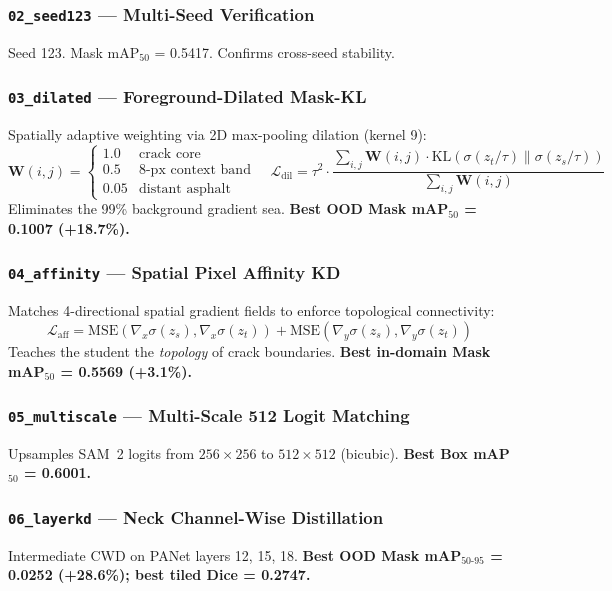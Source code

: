 \documentclass[12pt,a4paper]{article}
\begin{document}
\subsubsection{\texttt{02\_seed123} --- Multi-Seed Verification}
Seed 123. Mask mAP$_{50}$ = 0.5417. Confirms cross-seed stability.

\subsubsection{\texttt{03\_dilated} --- Foreground-Dilated Mask-KL}
\label{sec:dilated}
Spatially adaptive weighting via 2D max-pooling dilation (kernel 9):
\[
\mathbf{W}(i,j)=
\begin{cases}1.0 & \text{crack core}\\0.5 & \text{8-px context band}\\0.05 & \text{distant asphalt}\end{cases}
\quad
\mathcal{L}_\text{dil}=\tau^2\cdot\frac{\sum_{i,j}\mathbf{W}(i,j)\cdot\mathrm{KL}(\sigma(z_t/\tau)\|\sigma(z_s/\tau))}{\sum_{i,j}\mathbf{W}(i,j)}
\]
Eliminates the 99\% background gradient sea.
\textbf{Best OOD Mask mAP$_{50}$ = 0.1007 (+18.7\%).}

\subsubsection{\texttt{04\_affinity} --- Spatial Pixel Affinity KD}
\label{sec:affinity}
Matches 4-directional spatial gradient fields to enforce topological
connectivity:
\[
\mathcal{L}_\text{aff}=
  \mathrm{MSE}(\nabla_x\sigma(z_s),\nabla_x\sigma(z_t))+
  \mathrm{MSE}(\nabla_y\sigma(z_s),\nabla_y\sigma(z_t))
\]
Teaches the student the \emph{topology} of crack boundaries.
\textbf{Best in-domain Mask mAP$_{50}$ = 0.5569 (+3.1\%).}

\subsubsection{\texttt{05\_multiscale} --- Multi-Scale 512 Logit Matching}
Upsamples SAM~2 logits from $256\times256$ to $512\times512$ (bicubic).
\textbf{Best Box mAP$_{50}$ = 0.6001.}

\subsubsection{\texttt{06\_layerkd} --- Neck Channel-Wise Distillation}
\label{sec:layerkd_variant}
Intermediate CWD on PANet layers 12, 15, 18.
\textbf{Best OOD Mask mAP$_{50\text{-}95}$ = 0.0252 (+28.6\%); best tiled Dice = 0.2747.}
\end{document}
